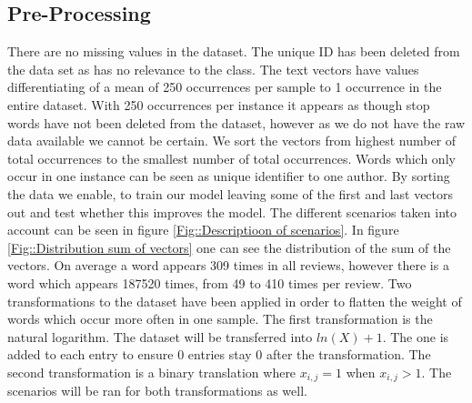 \documentclass[11pt]{article}
\begin{document}
\subsection{Pre-Processing}
There are no missing values in the dataset. The unique ID has been deleted from the data set as has no relevance to the class. The text vectors have values differentiating of a mean of 250 occurrences per sample to 1 occurrence in the entire dataset. With 250 occurrences per instance it appears as though stop words have not been deleted from the dataset, however as we do not have the raw data available we cannot be certain. 
\newline
We sort the vectors from highest number of total occurrences to the smallest number of total occurrences. Words which only occur in one instance can be seen as unique identifier to one author. By sorting the data we enable, to train our model leaving some of the first and last vectors out and test whether this improves the model. The different scenarios taken into account can be seen in figure \ref{Fig::Descriptioon of scenarios}.
\newline
In figure \ref{Fig::Distribution sum of vectors} one can see the distribution of the sum of the vectors. On average a word appears 309 times in all reviews, however there is a word which appears 187520 times, from 49 to 410 times per review.
\newline
Two transformations to the dataset have been applied in order to flatten the weight of words which occur more often in one sample. The first transformation is the natural logarithm. The dataset will be transferred into $ln(X)+1$. The one is added to each entry to ensure 0 entries stay 0 after the transformation. The second transformation is a binary translation where $x_{i,j}=1$ when $x_{i,j}>1$. The scenarios will be ran for both transformations as well.  
%
\end{document}
